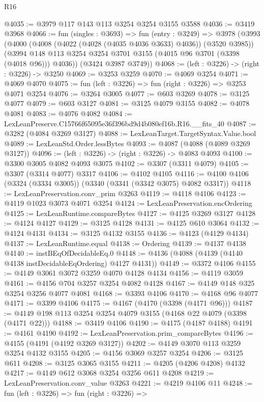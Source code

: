 \begin{lexlean}{R16}
\begin{coremodule}
@4035 := @3979 @117 @143 @113 @3254 @3254 @3155 @3588
@4036 := @3419 @3968
@4066 := fun (singles : @3693) =>
  fun (entry : @3249) =>
  @3978
    (@3993
      (@4000
        (@4008 (@4022 (@4028 (@4035 @4036 @3633) @4036)) (@3520 @3985))
        (@3994 @148 @113 @3254 @3254 @3701 @3155 (@4015 @96 @3701 (@3398 (@4018 @96))) @4036))
      (@3424 @3987 @3749))
@4068 := (left : @3226) -> (right : @3226) -> @3250
@4069 := @3253 @3259
@4070 := @4069 @3254
@4071 := @4069 @4070
@4075 := fun (left : @3226) => fun (right : @3226) => @3253 @4071 @3254
@4076 := @3264 @3005
@4077 := @603 @3269
@4078 := @3125 @4077
@4079 := @603 @3127
@4081 := @3125 @4079 @3155
@4082 := @4078 @4081
@4083 := @4076 @4082
@4084 := LexLeanPreserve.C15766f65095e36f396bd9d4b080ef16b.R16.__fits_40
@4087 := @3282 (@4084 @3269 @3127)
@4088 := LexLeanTarget.TargetSyntax.Value.bool
@4089 := LexLeanStd.Order.lessBytes
@4093 := @4087 (@4088 (@4089 @3269 @3127))
@4096 := (left : @3226) -> (right : @3226) -> @4083 @4093
@4100 := @3300 @3005 @4082 @4093 @3075
@4102 := @3307 (@3311 @4079)
@4105 := @3307 (@3314 @4077) @3317
@4106 := @4102 @4105
@4116 := @4100 @4106 (@3324 (@3334 @3005)) (@3340 (@3341 (@3342 @3075) @4082 @3317))
@4118 := LexLeanPreservation.conv_prim @3263
@4119 := @4118 @4106
@4123 := @4119 @1023 @3073 @4071 @3254
@4124 := LexLeanPreservation.encOrdering
@4125 := LexLeanRuntime.compareBytes
@4127 := @4125 @3269 @3127
@4128 := @4124 @4127
@4129 := @3125 @4128
@4131 := @4125 @610 @3064
@4132 := @4124 @4131
@4134 := @3125 @4132 @3155
@4136 := @4123 (@4129 @4134)
@4137 := LexLeanRuntime.equal
@4138 := Ordering
@4139 := @4137 @4138
@4140 := instBEqOfDecidableEq.{0}
@4148 := @4136 (@4088 (@4139 (@4140 @4138 instDecidableEqOrdering) @4127 @4131))
@4149 := @3372 @4106
@4155 := @4149 @3061 @3072 @3259 @4070 @4128 @4134
@4156 := @4119 @3059
@4161 := @4156 @704 @3257 @3254 @4082 @4128
@4167 := @4149 @148 @325 @3254 @3256 @4077 @4081
@4168 := @3393 @4106
@4170 := @4168 @96 @4077
@4171 := @3399 @4106
@4175 := @4167 (@4170 (@3398 (@4171 @96)))
@4187 := @4149 @198 @113 @3254 @3254 @4079 @3155 (@4168 @22 @4079 (@3398 (@4171 @22)))
@4188 := @3419 @4106
@4190 := @4175 (@4187 @4188)
@4191 := @4161 @4190
@4192 := LexLeanPreservation.prim_compareBytes
@4196 := @4155 (@4191 (@4192 @3269 @3127))
@4202 := @4149 @3070 @113 @3259 @3254 @4132 @3155
@4205 := @4156 @3069 @3257 @3254
@4206 := @3125 @611
@4208 := @3125 @3065 @3155
@4211 := @4205 (@4206 @4208) @4132
@4217 := @4149 @612 @3068 @3254 @3256 @611 @4208
@4219 := LexLeanPreservation.conv_value @3263
@4221 := @4219 @4106 @11
@4248 := fun (left : @3226) =>
  fun (right : @3226) =>

\end{coremodule}
\end{lexlean}
